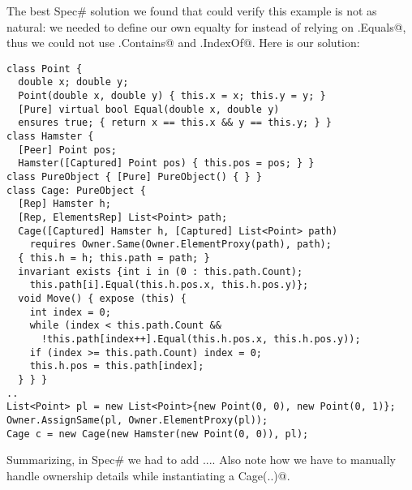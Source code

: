 The best Spec\# solution we found that could verify this example is not as natural:
we needed to define our own equalty for \Q@Point@ instead of relying on \Q@Object.Equals@,
thus we could not use \Q@List.Contains@ and \Q@List.IndexOf@.
Here is our solution:
\begin{lstlisting}[language={[Sharp]C}, morekeywords={invariant,ensures,requires,expose,exists}]
class Point {
  double x; double y;
  Point(double x, double y) { this.x = x; this.y = y; }
  [Pure] virtual bool Equal(double x, double y)
  ensures true; { return x == this.x && y == this.y; } }
class Hamster {
  [Peer] Point pos;
  Hamster([Captured] Point pos) { this.pos = pos; } }
class PureObject { [Pure] PureObject() { } }
class Cage: PureObject {
  [Rep] Hamster h;
  [Rep, ElementsRep] List<Point> path;
  Cage([Captured] Hamster h, [Captured] List<Point> path)
    requires Owner.Same(Owner.ElementProxy(path), path);
  { this.h = h; this.path = path; }
  invariant exists {int i in (0 : this.path.Count);
    this.path[i].Equal(this.h.pos.x, this.h.pos.y)};
  void Move() { expose (this) {
    int index = 0;
    while (index < this.path.Count && 
      !this.path[index++].Equal(this.h.pos.x, this.h.pos.y));
    if (index >= this.path.Count) index = 0;
    this.h.pos = this.path[index];
  } } }
..
List<Point> pl = new List<Point>{new Point(0, 0), new Point(0, 1)};
Owner.AssignSame(pl, Owner.ElementProxy(pl));
Cage c = new Cage(new Hamster(new Point(0, 0)), pl);

\end{lstlisting}
Summarizing, in Spec\# we had to add ....
Also note how we have to manually handle ownership details while instantiating a \Q@new Cage(..)@.
